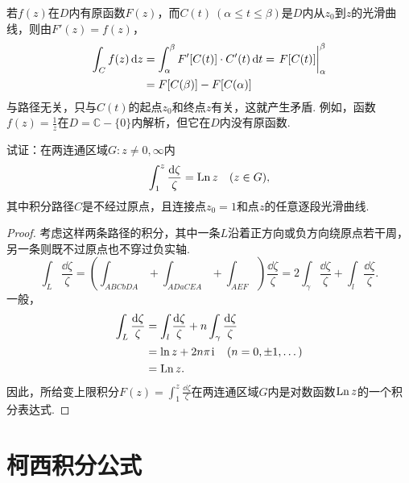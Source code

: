 若\(f(z)\)在\(D\)内有原函数\(F(z)\)，而\(C(t)\ (\alpha\leq t \leq\beta)\)是\(D\)内从\(z_0\)到\(z\)的光滑曲线，则由\(F'(z) = f(z)\)，\begin{align*}
\int_C f(z) \dd{z}
&= \int_{\alpha}^{\beta} F'[C(t)] \cdot C'(t) \dd{t}
= \eval{F[C(t)]}_{\alpha}^{\beta} \\
&= F[C(\beta)] - F[C(\alpha)]
\end{align*}
与路径无关，只与\(C(t)\)的起点\(z_0\)和终点\(z\)有关，这就产生矛盾.
例如，函数\(f(z) = \frac{1}{z}\)在\(D=\mathbb{C}-\{0\}\)内解析，但它在\(D\)内没有原函数.
\begin{example}%
\def\f{\frac{\dd{\zeta}}{\zeta}}
试证：在两连通区域\(G: z\neq0,\infty\)内\[
\int_1^z \f
= \Ln z
\quad (z \in G),
\]其中积分路径\(C\)是不经过原点，且连接点\(z_0=1\)和点\(z\)的任意逐段光滑曲线.
\begin{proof}
考虑这样两条路径的积分，其中一条\(L\)沿着正方向或负方向绕原点若干周，另一条则既不过原点也不穿过负实轴.
\[
\int_L \f
= \left(\int_{ABCbDA} + \int_{ADaCEA} + \int_{AEF}\right) \f
= 2 \int_{\gamma} \f + \int_l \f.
\]
一般，\begin{align*}
\int_L \f
&= \int_l \f + n \int_{\gamma} \f \\
&= \ln z + 2n\pi\iu \quad(n=0,\pm1,\dotsc) \\
&= \Ln z.
\end{align*}
因此，所给变上限积分\(F(z) = \int_1^z \f\)在两连通区域\(G\)内是对数函数\(\operatorname{Ln} z\)的一个积分表达式.
\end{proof}
\end{example}

\section{柯西积分公式}

